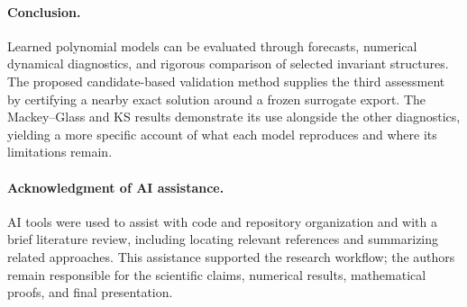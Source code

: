 \documentclass[11pt]{article}
\begin{document}
\enlargethispage{\baselineskip}
\paragraph{Conclusion.}
Learned polynomial models can be evaluated through forecasts, numerical
dynamical diagnostics, and rigorous comparison of selected invariant
structures. The proposed candidate-based validation method supplies the third
assessment by certifying a nearby exact solution around a frozen surrogate
export. The Mackey--Glass and KS results demonstrate its use alongside the
other diagnostics, yielding a more specific account of what each model
reproduces and where its limitations remain.

\begin{samepage}
\paragraph{Acknowledgment of AI assistance.}
AI tools were used to assist with code and repository organization and with a
brief literature review, including locating relevant references and summarizing
related approaches. This assistance supported the research workflow; the authors
remain responsible for the scientific claims, numerical results, mathematical
proofs, and final presentation.

\end{samepage}
\end{document}
